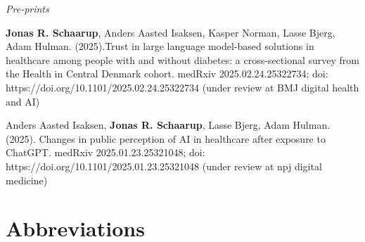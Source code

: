 \documentclass[
  a4paper,
  headsepline=true,
  open=any]{scrbook}
\begin{document}
\emph{Pre-prints}

\textbf{Jonas R. Schaarup}, Anders Aasted Isaksen, Kasper Norman, Lasse
Bjerg, Adam Hulman. (2025).Trust in large language model-based solutions
in healthcare among people with and without diabetes: a cross-sectional
survey from the Health in Central Denmark cohort. medRxiv
2025.02.24.25322734; doi: https://doi.org/10.1101/2025.02.24.25322734
(under review at BMJ digital health and AI)

Anders Aasted Isaksen, \textbf{Jonas R. Schaarup}, Lasse Bjerg, Adam
Hulman. (2025). Changes in public perception of AI in healthcare after
exposure to ChatGPT. medRxiv 2025.01.23.25321048; doi:
https://doi.org/10.1101/2025.01.23.25321048 (under review at npj digital
medicine)

\newpage

{\let\clearpage\relax \tableofcontents} 

\listoffigures

\listoftables


\hypertarget{abbreviations}{%
\chapter*{Abbreviations}\label{abbreviations}}

\end{document}
